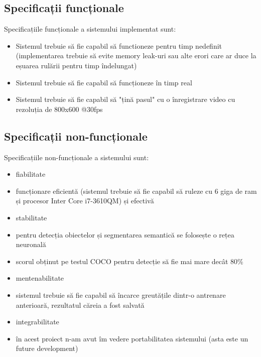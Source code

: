 \subsection{Specificații funcționale}
Specificațiile funcționale a sistemului implementat sunt:
\begin{itemize}
	\item Sistemul trebuie să fie capabil să functioneze pentru timp nedefinit (implementarea trebuie să evite memory leak-uri sau alte erori care ar duce la eșuarea rulării pentru timp îndelungat)
	\item Sistemul trebuie să fie capabil să funcționeze în timp real
	\item Sistemul trebuie să fie capabil să "țină pasul" cu o înregistrare video cu rezoluția de 800x600 @30fps
\end{itemize}
\subsection{Specificații non-funcționale}
Specificațiile non-funcționale a sistemului sunt:
\begin{itemize}
	\item fiabilitate
	\item funcționare eficientă (sistemul trebuie să fie capabil să ruleze cu 6 giga de ram și procesor Inter Core i7-3610QM) și efectivă
	\item stabilitate
	\item pentru detecția obiectelor și segmentarea semantică se folosește o rețea neuronală
	\item scorul obținut pe testul COCO pentru detecție să fie mai mare decât  80\%
	\item mentenabilitate
	\item sistemul trebuie să fie capabil să încarce greutățile dintr-o antrenare anterioară, rezultatul căreia a fost salvată
	\item integrabilitate
	\item în acest proiect n-am avut îm vedere portabilitatea sistemului (asta este un future development)
\end{itemize}

